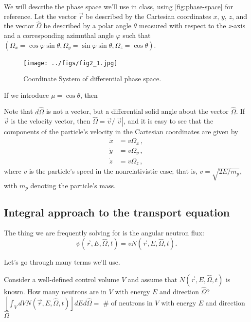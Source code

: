 \documentclass[12pt]{article}
\newif\ifeqns
\newcommand{\rvec}{\ensuremath{\vec{r}}}
\newcommand{\omvec}{\ensuremath{\hat{\Omega}}}
\begin{document}
We will describe the phase space we'll use in class, using \autoref{fig:phase-space} for reference. Let the vector $\rvec$ be described by the Cartesian coordinates $x$, $y$, $z$, and the vector
$\omvec$ be described by a polar angle $\theta$ measured with respect to the $z$-axis
 and a corresponding azimuthal angle $\varphi$ such that $(\Omega_x=\cos\varphi \sin\theta, \Omega_y = \sin\varphi \sin\theta, \Omega_z = \cos\theta)$.
\begin{figure}%
\centering
\texttt{[image: ../figs/fig2\_1.jpg]}
\caption{Coordinate System of differential phase space.}
\label{fig:phase-space}
\end{figure}
 If we introduce $\mu = \cos\theta$, then
 \ifeqns
\begin{align*}
dV &= dxdydz\,,
\\
d\omvec &=  \sin\theta d\theta d\varphi = d\mu d\varphi\,. 
\end{align*}
\else
\vspace*{3em}
\fi
Note that $d\omvec $ is not a vector, but a differential solid angle about the vector $\omvec$.
If $\vec{v}$ is the velocity vector, then $\omvec = \vec{v}/{|\vec{v}|}$,
and
it is easy to see that the components of the particle's velocity in the Cartesian
coordinates are given by
\begin{align*}
\dot x &=  v\Omega_x\,,\\
\dot y &=  v\Omega_y\,,\\
\dot z &=  v\Omega_z\,,
\end{align*}
 where $v$ is the particle's speed in the nonrelativistic case; that is, $v = \sqrt{2E/m_p}$, with $m_p$
denoting the particle's mass.

\subsection*{Integral approach to the transport equation}
The thing we are frequently solving for is the angular neutron flux:
\[
\psi(\rvec, E, \omvec, t)=vN(\rvec, E, \omvec, t).
\] 

Let's go through many terms we'll use. 

Consider a well-defined control volume $V$ and assume that $N(\rvec, E, \omvec, t)$ is known. How many neutrons are in $V$ with energy $E$ and direction $\omvec$?
$\left[\int_V dV N(\rvec, E, \omvec, t)\right] dEd\omvec =$ \# of neutrons in $V$ with energy $E$ and direction $\omvec$
\end{document}
